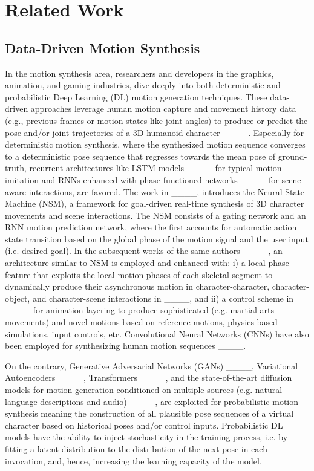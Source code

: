 \section{Related Work}
\subsection{Data-Driven Motion Synthesis}
 
In the motion synthesis area, researchers and developers in the graphics, animation, and gaming industries, dive deeply into both deterministic and probabilistic Deep Learning (DL) motion generation
techniques. These data-driven approaches leverage human motion capture and movement history data (e.g., previous frames or motion states like joint angles) to produce or predict the pose and/or joint trajectories of a 3D humanoid character ____. Especially for deterministic motion synthesis, where the synthesized motion sequence converges to a deterministic pose sequence that regresses towards the mean pose of ground-truth, recurrent architectures like LSTM models ____ for typical motion imitation and RNNs enhanced with phase-functioned networks ____ for scene-aware interactions, are favored. The work in ____, introduces the Neural State Machine (NSM), a framework for goal-driven real-time synthesis of 3D character movements and scene interactions. The NSM consists of a gating network and an RNN motion prediction network, where the first accounts for automatic action state transition based on the global phase of the motion signal and the user input (i.e. desired goal). In the subsequent works of the same authors ____, an architecture similar to NSM is employed and enhanced with: i) a local phase feature that exploits the local motion phases of each skeletal segment to dynamically produce their asynchronous motion in character-character, character-object, and character-scene interactions in ____, and ii) a control scheme in ____ for animation layering to produce sophisticated (e.g. martial arts movements) and novel motions based on reference motions, physics-based simulations, input controls, etc.
Convolutional Neural Networks (CNNs) have also been employed for synthesizing human motion sequences ____.

On the contrary, Generative Adversarial Networks (GANs) ____, Variational Autoencoders ____, Transformers ____, and the state-of-the-art diffusion models for motion generation conditioned on multiple sources (e.g. natural language descriptions and audio) ____, are exploited for probabilistic motion synthesis meaning the construction of all plausible pose sequences of a virtual character based on historical poses and/or control inputs. Probabilistic DL models have the ability to inject stochasticity in the training process, i.e. by fitting a latent distribution to the distribution of the next pose in each invocation, and, hence, increasing the learning capacity of the model.

